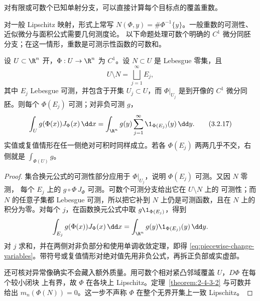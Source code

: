 对有限或可数个已知单射分支，可以直接计算每个目标点的覆盖重数。

\begin{remark}[一般重数公式的边界]\label{def:3-2-2-3}
对一般 Lipschitz 映射，形式上常写
$N(\Phi,y)=\#\Phi^{-1}\{y\}$。一般重数的可测性、近似微分与面积公式需要几何测度论。
以下命题处理可数个明确的 $C^1$ 微分同胚分支；在这一情形，重数是可测示性函数的可数和。
\end{remark}

\begin{proposition}[分片单射版本]\label{proposition:3-2-2-4}
设 $U\subset\R^n$ 开，$\Phi:U\to\R^n$ 为 $C^1$。设 $N\subset U$ 是 Lebesgue 零集，且
\[
 U\setminus N=\bigsqcup_{j=1}^{\infty}E_j,
\]
其中 $E_j$ Lebesgue 可测，并包含于开集 $U_j\subset U$，而
$\Phi|_{U_j}$ 是到开像的 $C^1$ 微分同胚。则每个 $\Phi(E_j)$ 可测；对非负可测 $g$，
\[
 \int_Ug(\Phi(x))J_\Phi(x)\,\dd x
 =\int_{\R^n}g(y)\sum_{j=1}^{\infty}\1_{\Phi(E_j)}(y)\,\dd y.
 \tag{3.2.17}\label{eq:piecewise-change-variables}
\]
实值或复值情形在任一侧绝对可积时同样成立。若各 $\Phi(E_j)$ 两两几乎不交，右侧就是
$\int_{\Phi(U)}g$。
\end{proposition}

\begin{proof}
集合换元公式的可测性部分应用于 $\Phi|_{U_j}$，说明 $\Phi(E_j)$ 可测。又因 $N$ 零测，
每个 $E_j$ 上的 $g\circ\Phi\,J_\Phi$ 可测。可数个可测分支给出它在 $U\setminus N$ 上的
可测性；而 $N$ 的任意子集都 Lebesgue 可测，所以把它补到 $N$ 上仍是可测函数，且在 $N$
上的积分为零。对每个 $j$，在函数换元公式中取
$g\1_{\Phi(E_j)}$，得到
\[
 \int_{E_j}g(\Phi(x))J_\Phi(x)\,\dd x
 =\int_{\R^n}g(y)\1_{\Phi(E_j)}(y)\,\dd y.
\]
对 $j$ 求和，并在两侧对非负部分和使用单调收敛定理，即得
\eqref{eq:piecewise-change-variables}。带符号或复值情形对绝对值先用非负公式，再拆正负部或实虚部。

还可核对异常像确实不会藏入额外质量。用可数个相对紧凸邻域覆盖 $U$，$D\Phi$ 在每个较小闭块
上有界，故 $\Phi$ 在各块上 Lipschitz。定理~\ref{theorem:2-4-3-2} 与可数并给出
$m_n(\Phi(N))=0$。这一步不声称 $\Phi$ 在整个无界开集上一致 Lipschitz。
\end{proof}

